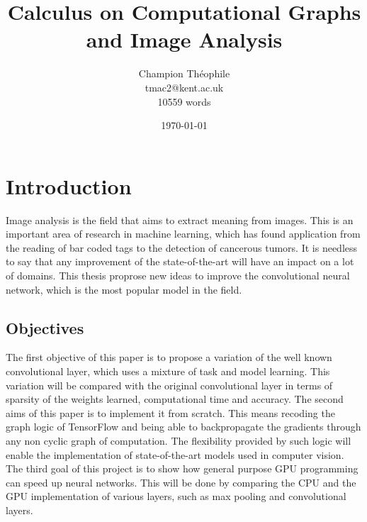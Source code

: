 \documentclass[11pt]{report}
\title{\textbf{Calculus on Computational Graphs and Image Analysis}}
\author{
\begin{tabular}[t]{cc}
Champion Théophile \\
tmac2@kent.ac.uk \\
10559 words\\
\end{tabular}
}
\date{\today}
\begin{document}
\maketitle

\tableofcontents

\glsaddall
\printglossary[type=\acronymtype, nonumberlist]
\printglossary[type=main, nonumberlist]

\listoffigures
{}
\listoftables
{}

\newpage

\chapter{Introduction}

Image analysis is the field that aims to extract meaning from images. This is an important area of research in machine learning, which has found application from the reading of bar coded tags to the detection of cancerous tumors. It is needless to say that any improvement of the state-of-the-art will have an impact on a lot of domains. This thesis proprose new ideas to improve the convolutional neural network, which is the most popular model in the field.

\section{Objectives}

The first objective of this paper is to propose a variation of the well known convolutional layer, which uses a mixture of task and model learning. This variation will be compared with the original convolutional layer in terms of sparsity of the weights learned, computational time and accuracy.
\newline
\newline
\noindent The second aims of this paper is to implement it from scratch. This means recoding the graph logic of TensorFlow and being able to backpropagate the gradients through any non cyclic graph of computation. The flexibility provided by such logic will enable the implementation of state-of-the-art models used in computer vision.
\newline
\newline
\noindent The third goal of this project is to show how general purpose GPU programming can speed up neural networks. This will be done by comparing the CPU and the GPU implementation of various layers, such as max pooling and convolutional layers.
\end{document}
